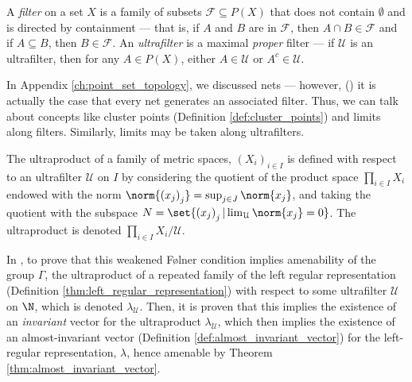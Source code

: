 A \textit{filter} on a set $X$ is a family of subsets $\mathcal{F}\subseteq P(X)$ that does not contain $\emptyset$ and is directed by containment --- that is, if $A$ and $B$ are in $\mathcal{F}$, then $A\cap B\in \mathcal{F}$ and if $A\subseteq B$, then $B\in \mathcal{F}$. An \textit{ultrafilter} is a maximal \textit{proper} filter --- if $\mathcal{U}$ is an ultrafilter, then for any $A\in P(X)$, either $A\in \mathcal{U}$ or $A^{c}\in \mathcal{U}$.\newline

In Appendix \ref{ch:point_set_topology}, we discussed nets --- however, (\cite[Theorem 2.25]{aliprantis_infinite_dimensional_analysis}) it is actually the case that every net generates an associated filter. Thus, we can talk about concepts like cluster points (Definition \ref{def:cluster_points}) and limits along filters. Similarly, limits may be taken along ultrafilters.\newline

The ultraproduct of a family of metric spaces, $\left( X_i \right)_{i\in I}$ is defined with respect to an ultrafilter $\mathcal{U}$ on $I$ by considering the quotient of the product space $\prod_{i\in I}X_i$ endowed with the norm $\norm{\left( x_j \right)_j} = \sup_{j\in J}\norm{x_j} $, and taking the quotient with the subspace $N = \set{\left( x_j \right)_j | \lim_{\mathcal{U}}\norm{x_j} = 0}$. The ultraproduct is denoted $\prod_{i\in I}X_i/\mathcal{U}$.\newline

In \cite[Appendix A.3]{juschenko_amenability}, to prove that this weakened Følner condition implies amenability of the group $\Gamma$, the ultraproduct of a repeated family of the left regular representation (Definition \ref{thm:left_regular_representation}) with respect to some ultrafilter $\mathcal{U}$ on $\N$, which is denoted $\lambda_{\mathcal{U}}$. Then, it is proven that this implies the existence of an \textit{invariant} vector for the ultraproduct $\lambda_{\mathcal{U}}$, which then implies the existence of an almost-invariant vector (Definition \ref{def:almost_invariant_vector}) for the left-regular representation, $\lambda$, hence amenable by Theorem \ref{thm:almost_invariant_vector}.

